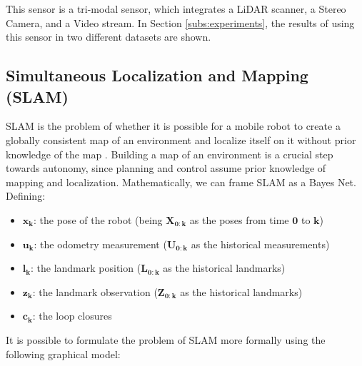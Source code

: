 \documentclass[11pt]{article}
\begin{document}
This sensor is a tri-modal sensor, which integrates a LiDAR scanner, a Stereo Camera, and a Video stream. In Section \ref{subs:experiments}, the results of using this sensor in two different datasets are shown.
	

	\subsection{Simultaneous Localization and Mapping (SLAM)}
	\label{subs:SLAMRev}

SLAM is the problem of whether it is possible for a mobile robot to create a globally consistent map of an environment and localize itself on it without prior knowledge of the map \cite{SLAMPartI}\cite{Cadena}. Building a map of an environment is a crucial step towards autonomy, since planning and control assume prior knowledge of mapping and localization. Mathematically, we can frame SLAM as a Bayes Net. Defining:
	
\begin{itemize}
\item $\mathbf{x_k}$: the pose of the robot (being $\mathbf{X_{0:k}}$ as the poses from time $\mathbf{0}$ to $\mathbf{k}$)
\item $\mathbf{u_k}$: the odometry measurement ($\mathbf{U_{0:k}}$ as the historical measurements)
\item $\mathbf{l_k}$: the landmark position ($\mathbf{L_{0:k}}$ as the historical landmarks)
\item $\mathbf{z_k}$: the landmark observation ($\mathbf{Z_{0:k}}$ as the historical landmarks)
\item $\mathbf{c_k}$: the loop closures
\end{itemize}

It is possible to formulate the problem of SLAM more formally using the following graphical model:
\end{document}

